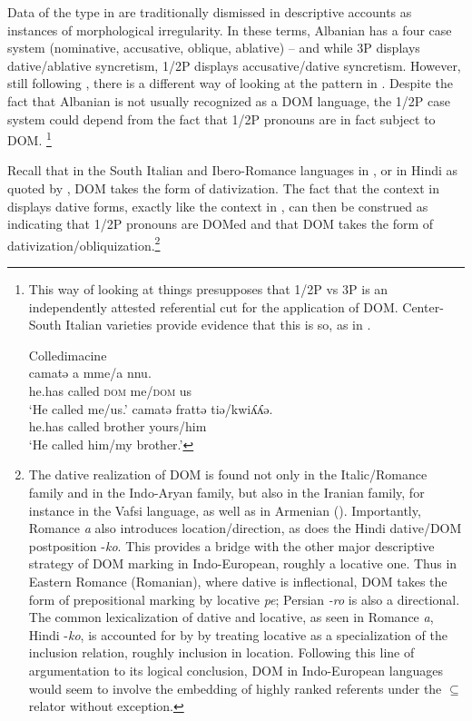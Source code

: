 \documentclass[output=paper,colorlinks,citecolor=brown,nonflat]{./langscibook}
\begin{document}
Data of the type in  are traditionally dismissed in descriptive accounts as instances of morphological irregularity. In these terms, Albanian has a four case system (nominative, accusative, oblique, ablative) – and while 3P displays dative/ablative syncretism, 1/2P displays accusative/dative syncretism. However, still following \citet{ManziniSavoia2014}, there is a different way of looking at the pattern in . Despite the fact that Albanian is not usually recognized as a DOM language, the 1/2P case system could depend from the fact that 1/2P pronouns are in fact subject to DOM.{} \footnote{This way of looking at things presupposes that 1/2P vs 3P is an independently attested referential cut for the application of DOM. Center-South Italian varieties provide  evidence that this is so, as in .

\ea \label{ex:manzini:i}%
    Colledimacine \citep{ManziniSavoia2005}\\
    \ea
     {camatə} {a} {mme/a} {nnu}.\\
        {he.has}  {called} \textsc{dom} {me/\textsc{dom}} {us}\\
    \glt ‘He called me/us.’
    \ex 
       {camatə} {frattə} {tiə/kwiʎʎə}.\\
        {he.has}  called   brother yours/him\\
    \glt ‘He called him/my brother.’
    \z
\z
}

Recall that in the South Italian and Ibero-Romance languages in , or in Hindi as quoted by \citet{Torrego1998}, DOM takes the form of dativization. The fact that the context in  displays dative forms, exactly like the context in , can then be construed as indicating that 1/2P pronouns are DOMed and that DOM takes the form of dativization/obliquization.\footnote{{ The dative realization of DOM is found not only in the Italic/Romance family and in the Indo-Aryan family, but also in the Iranian family, for instance in the Vafsi language, as well as in Armenian (\citealt{ManziniFranco2016}). Importantly, Romance \textit{a} also introduces location/direction, as does the Hindi dative/DOM postposition -\textit{ko}.} This provides a bridge with the other major descriptive strategy of DOM marking in Indo-European, roughly a locative one. Thus in Eastern Romance (Romanian), where dative is inflectional, DOM takes the form of prepositional marking by locative \textit{pe}; Persian \textit{{}-ro} is also a directional.  The common lexicalization of dative and locative, as seen in Romance \textit{a}, Hindi -\textit{ko}, is accounted for by \citet{FrancoManzini2017Ins} by treating locative as a specialization of the inclusion relation, roughly inclusion in location. Following this line of argumentation to its logical conclusion, DOM in Indo-European languages would seem to involve the embedding of highly ranked referents under the \textrm{${\subseteq}$} relator without exception.}  
\end{document}
